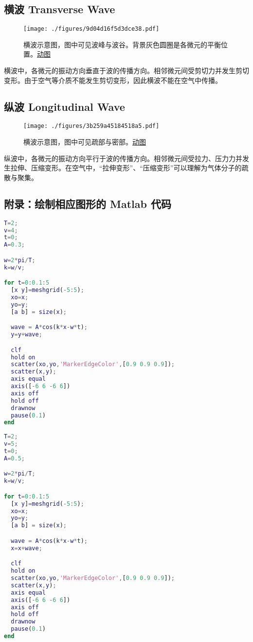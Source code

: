 
\subsection{横波 Transverse Wave}
\begin{figure}[ht]
\centering
\texttt{[image: ./figures/9d04d16f5d3dce38.pdf]}
\caption{横波示意图，图中可见波峰与波谷。背景灰色圆圈是各微元的平衡位置。\href{https://wuli.wiki/apps/waves.html}{动图}} \label{fig_LAT_1}
\end{figure}
横波中，各微元的振动方向垂直于波的传播方向。相邻微元间受剪切力并发生剪切变形。由于空气等介质不能发生剪切变形，因此横波不能在空气中传播。

\subsection{纵波 Longitudinal Wave}
\begin{figure}[ht]
\centering
\texttt{[image: ./figures/3b259a45184518a5.pdf]}
\caption{横波示意图，图中可见疏部与密部。\href{https://wuli.wiki/apps/waves.html}{动图}} \label{fig_LAT_2}
\end{figure}
纵波中，各微元的振动方向平行于波的传播方向。相邻微元间受拉力、压力力并发生拉伸、压缩变形。在空气中，“拉伸变形”、“压缩变形”可以理解为气体分子的疏散与聚集。

\subsection{附录：绘制相应图形的 Matlab 代码}
\begin{lstlisting}[language=matlab]
%绘制横波
T=2;
v=4;
t=0;
A=0.3;

w=2*pi/T;
k=w/v;

for t=0:0.1:5
  [x y]=meshgrid(-5:5);
  xo=x;
  yo=y;
  [a b] = size(x);

  wave = A*cos(k*x-w*t);
  y=y+wave;

  clf
  hold on
  scatter(xo,yo,'MarkerEdgeColor',[0.9 0.9 0.9]);
  scatter(x,y);
  axis equal
  axis([-6 6 -6 6])
  axis off
  hold off
  drawnow
  pause(0.1)
end

\end{lstlisting}

\begin{lstlisting}[language=matlab]
%绘制纵波
T=2;
v=5;
t=0;
A=0.5;

w=2*pi/T;
k=w/v;

for t=0:0.1:5
  [x y]=meshgrid(-5:5);
  xo=x;
  yo=y;
  [a b] = size(x);

  wave = A*cos(k*x-w*t);
  x=x+wave;

  clf
  hold on
  scatter(xo,yo,'MarkerEdgeColor',[0.9 0.9 0.9]);
  scatter(x,y);
  axis equal
  axis([-6 6 -6 6])
  axis off
  hold off
  drawnow
  pause(0.1)
end
\end{lstlisting}
